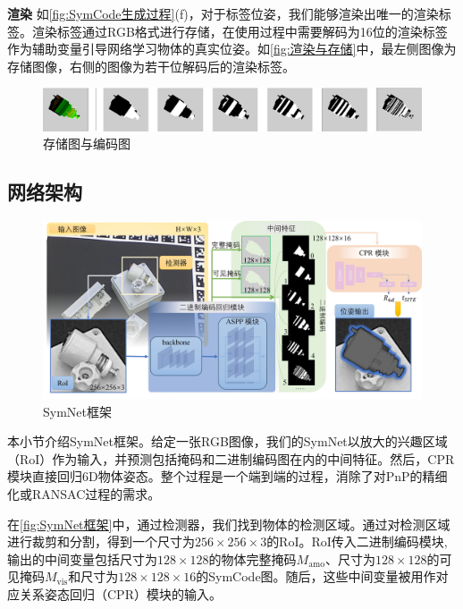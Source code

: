 \textbf{渲染 } 如\autoref{fig:SymCode生成过程}(f)，对于标签位姿，我们能够渲染出唯一的渲染标签。渲染标签通过RGB格式进行存储，在使用过程中需要解码为16位的渲染标签作为辅助变量引导网络学习物体的真实位姿。如\autoref{fig:渲染与存储}中，最左侧图像为存储图像，右侧的图像为若干位解码后的渲染标签。

\begin{figure}[ht]
    \centerline{\includegraphics[width=1.0\textwidth]{figure/symnet/渲染与存储.jpg}}
    \caption{存储图与编码图}
    \label{fig:渲染与存储}
\end{figure}

\subsection{网络架构}
\begin{figure}[t]
    \centerline{\includegraphics[width=1.0\textwidth]{figure/symnet/network.jpg}}
    \caption{SymNet框架}
    \label{fig:SymNet框架}
\end{figure}

本小节介绍SymNet框架。给定一张RGB图像，我们的SymNet以放大的兴趣区域（RoI）作为输入，并预测包括掩码和二进制编码图在内的中间特征。然后，CPR模块直接回归6D物体姿态。整个过程是一个端到端的过程，消除了对PnP的精细化或RANSAC过程的需求。

在\autoref{fig:SymNet框架}中，通过检测器，我们找到物体的检测区域。通过对检测区域进行裁剪和分割，得到一个尺寸为$256 \times 256 \times 3$的RoI。RoI传入二进制编码模块,输出的中间变量包括尺寸为$128 \times 128$的物体完整掩码$M_{\text{amo}}$、尺寸为$128 \times 128$的可见掩码$M_\text{{vis}}$和尺寸为$128 \times 128 \times 16$的SymCode图。随后，这些中间变量被用作对应关系姿态回归（CPR）模块的输入。

